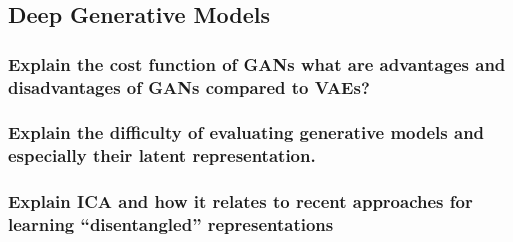 \documentclass{article}
\begin{document}
\subsection{Deep Generative Models}

\subsubsection{Explain the cost function of GANs what are advantages and disadvantages of GANs compared to VAEs?}

\subsubsection{Explain the difficulty of evaluating generative models and especially their latent representation.}

\subsubsection{Explain ICA and how it relates to recent approaches for learning ``disentangled'' representations}




%
%
\end{document}
